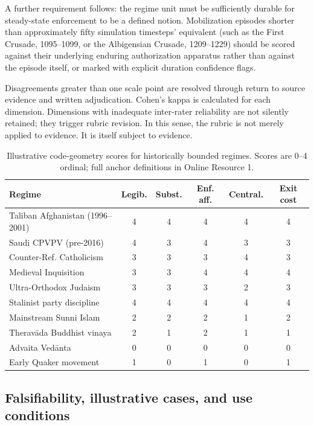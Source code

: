 \documentclass[12pt]{article}
\begin{document}
A further requirement follows: the regime unit must be sufficiently durable for steady-state enforcement to be a defined notion. Mobilization episodes shorter than approximately fifty simulation timesteps' equivalent (such as the First Crusade, 1095--1099, or the Albigensian Crusade, 1209--1229) should be scored against their underlying enduring authorization apparatus rather than against the episode itself, or marked with explicit duration confidence flags.

Disagreements greater than one scale point are resolved through return to source evidence and written adjudication. Cohen's kappa is calculated for each dimension. Dimensions with inadequate inter-rater reliability are not silently retained; they trigger rubric revision. In this sense, the rubric is not merely applied to evidence. It is itself subject to evidence.


\begin{table}[ht]
\centering
\caption{Illustrative code-geometry scores for historically bounded regimes. Scores are 0--4 ordinal; full anchor definitions in Online Resource 1.}
\label{tab:scores}
\begin{tabular}{lccccc}
\toprule
Regime & Legib. & Subst. & Enf. aff. & Central. & Exit cost \\
\midrule
Taliban Afghanistan (1996--2001) & 4 & 4 & 4 & 4 & 4 \\
Saudi CPVPV (pre-2016) & 4 & 3 & 4 & 3 & 3 \\
Counter-Ref. Catholicism & 3 & 3 & 3 & 4 & 3 \\
Medieval Inquisition & 3 & 3 & 4 & 4 & 4 \\
Ultra-Orthodox Judaism & 3 & 3 & 3 & 2 & 3 \\
Stalinist party discipline & 4 & 4 & 4 & 4 & 4 \\
Mainstream Sunni Islam & 2 & 2 & 2 & 1 & 2 \\
Therav\=ada Buddhist vinaya & 2 & 1 & 2 & 1 & 1 \\
Advaita Ved\=anta & 0 & 0 & 0 & 0 & 0 \\
Early Quaker movement & 1 & 0 & 1 & 0 & 1 \\
\bottomrule
\end{tabular}
\end{table}

\subsection{Falsifiability, illustrative cases, and use conditions}
\end{document}
